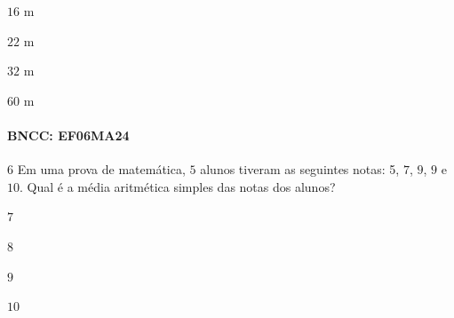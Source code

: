 \begin{escolha}
\item $16$ m
\item $22$ m
\item $32$ m
\item $60$ m
\end{escolha}

\paragraph{BNCC: EF06MA24 }


\num{6}  Em uma prova de matemática, $5$ alunos tiveram as seguintes notas: 5, $7$, $9$, $9$ e $10$. Qual é a média aritmética simples das notas dos alunos?

\begin{escolha}
\item $7$
\item $8$
\item $9$
\item $10$
\end{escolha}



